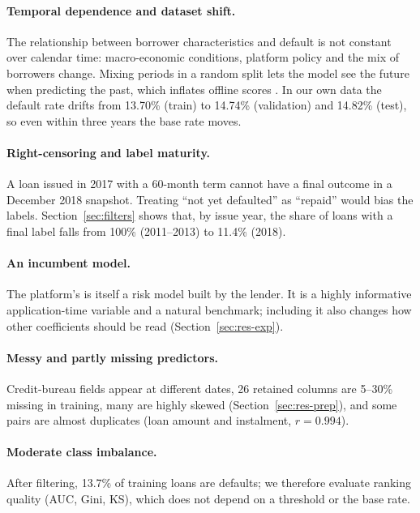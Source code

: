 \paragraph{Temporal dependence and dataset shift.} The relationship between borrower characteristics and default is not constant over calendar time: macro-economic conditions, platform policy and the mix of borrowers change. Mixing periods in a random split lets the model see the future when predicting the past, which inflates offline scores \cite{qian2021}. In our own data the default rate drifts from 13.70\% (train) to 14.74\% (validation) and 14.82\% (test), so even within three years the base rate moves.

\paragraph{Right-censoring and label maturity.} A loan issued in 2017 with a 60-month term cannot have a final outcome in a December 2018 snapshot. Treating ``not yet defaulted'' as ``repaid'' would bias the labels. Section~\ref{sec:filters} shows that, by issue year, the share of loans with a final label falls from 100\% (2011--2013) to 11.4\% (2018).

\paragraph{An incumbent model.} The platform's  is itself a risk model built by the lender. It is a highly informative application-time variable and a natural benchmark; including it also changes how other coefficients should be read (Section~\ref{sec:res-exp}).

\paragraph{Messy and partly missing predictors.} Credit-bureau fields appear at different dates, 26 retained columns are 5--30\% missing in training, many are highly skewed (Section~\ref{sec:res-prep}), and some pairs are almost duplicates (loan amount and instalment, $r=0.994$).

\paragraph{Moderate class imbalance.} After filtering, 13.7\% of training loans are defaults; we therefore evaluate ranking quality (AUC, Gini, KS), which does not depend on a threshold or the base rate.

